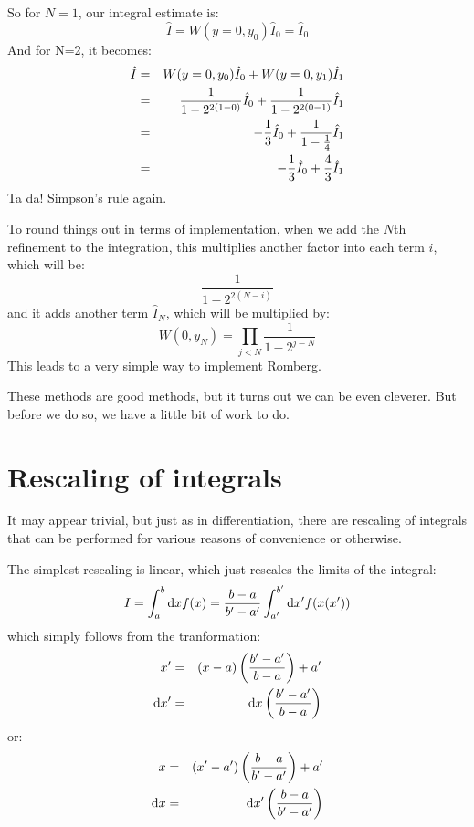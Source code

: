 So for $N=1$, our integral estimate is:
\begin{equation}
\hat I = W(y=0, y_0) \hat I_0 = \hat I_0
\end{equation}
And for N=2, it becomes:
\begin{eqnarray}
\hat I &=& W(y=0, y_0) \hat I_0 + W(y=0, y_1) \hat I_1 \cr
&=& \frac{1}{1 - 2^{2(1-0)}} \hat I_0 + \frac{1}{1 - 2^{2(0-1)}}\hat I_1 \cr
&=& - \frac{1}{3} \hat I_0 + \frac{1}{1 - \frac{1}{4}}\hat I_1 \cr
&=& - \frac{1}{3} \hat I_0 + \frac{4}{3}\hat I_1
\end{eqnarray}
Ta da! Simpson's rule again.

To round things out in terms of implementation, when we add the $N$th
refinement to the integration, this multiplies another factor into
each term $i$, which will be:
\begin{equation}
\frac{1}{1 - 2^{2(N-i)}}
\end{equation}
and it adds another term $\hat I_N$, which will be multiplied by:
\begin{equation}
W(0, y_N) = \prod_{j<N} \frac{1}{1 - 2^{j-N}}
\end{equation}
This leads to a very simple way to implement Romberg.

These methods are good methods, but it turns out we can be even
cleverer. But before we do so, we have a little bit of work to do.

\section{Rescaling of integrals}

It may appear trivial, but just as in differentiation, there are
rescaling of integrals that can be performed for various reasons of
convenience or otherwise. 

The simplest rescaling is linear, which just rescales the limits of
the integral:
\begin{equation}
 I = \int_a^b {\rm d}x f(x) = \frac{b-a}{b'-a'} \int_{a'}^{b'} {\rm d}x' f(x(x'))
\end{equation}
which simply follows from the tranformation:
\begin{eqnarray}
x' &=& (x-a) \left(\frac{b' - a'}{b-a}\right) + a' \cr
{\rm d}x' &=& {\rm d}x \left(\frac{b' - a'}{b-a}\right)
\end{eqnarray}
or:
\begin{eqnarray}
x &=& (x'-a') \left(\frac{b - a}{b'-a'}\right) + a' \cr
{\rm d}x &=& {\rm d}x' \left(\frac{b - a}{b'-a'}\right)
\end{eqnarray}

